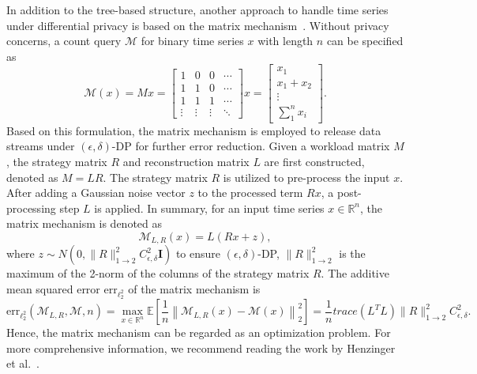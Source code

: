 In addition to the tree-based structure, another approach to handle time series under differential privacy is based on the matrix mechanism~\cite{li2015matrix, henzinger2023almost}.
 Without privacy concerns, a count query $\mathcal{M}$ for binary time series $x$ with length $n$ can be specified as 
\begin{equation}
	\mathcal{M}(x) = Mx= \begin{bmatrix}\nonumber
		1 & 0 & 0 & \cdots  \\
		1 & 1 & 0 & \cdots \\
		1 & 1 & 1 & \cdots \\
		\vdots& \vdots & \vdots & \ddots
	\end{bmatrix} x = \begin{bmatrix}
	x_1\\
	x_1+x_2 \\
	\vdots \\
	\sum_{1}^{n} x_i
\end{bmatrix}.
\end{equation}
Based on this formulation, the matrix mechanism is employed to release data streams under $(\epsilon, \delta)$-DP for further error reduction. Given a workload matrix $M$, the strategy matrix $R$ and reconstruction matrix $L$ are first constructed, denoted as $M=LR$. The strategy matrix $R$ is utilized to pre-process the input $x$. After adding a Gaussian noise vector $z$ to the processed term $Rx$, a post-processing step $L$ is applied. In summary, for an input time series $x\in \mathbb{R}^n$, the matrix mechanism is denoted as 
\begin{equation}\nonumber
	\mathcal{M}_{L, R}(x)=L(Rx+z),
\end{equation}
where $z\sim N(0, \lVert R \rVert^2_{1\to 2}C^2_{\epsilon, \delta}\textbf{I})$ to ensure $(\epsilon, \delta)$-DP, $\lVert R \rVert^2_{1\to 2}$ is the maximum of the 2-norm of the columns of the strategy matrix $R$. The additive mean squared error $\mathrm{err}_{\ell^2_2}$ of the matrix mechanism is 
\begin{equation}\nonumber
	\mathrm{err}_{\ell^2_2}(\mathcal{M}_{L, R}, \mathcal{M}, n) =  \max_{x \in \mathbb{R}^n} \mathbb{E}\left[\frac{1}{n} \left\|  \mathcal{M}_{L, R}(x) - \mathcal{M}(x) \right\|_2^2 \right]=\frac{1}{n} trace(L^TL)\lVert R \rVert^2_{1\to 2}C^2_{\epsilon, \delta}.
\end{equation}
Hence, the matrix mechanism can be regarded as an optimization problem. For more comprehensive information, we recommend reading the work by Henzinger et al.~\cite{henzinger2023almost}.

